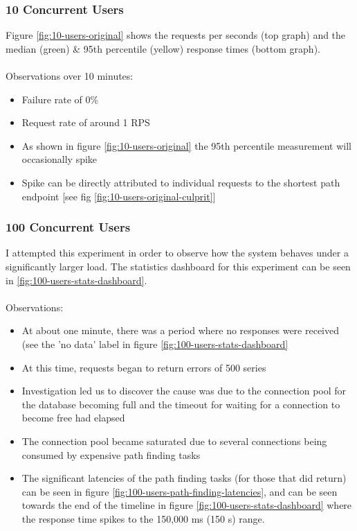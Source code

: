 \subsubsection{10 Concurrent Users}
Figure \ref{fig:10-users-original} shows the requests per seconds (top graph) and the median (green) \& 95th percentile (yellow) response times (bottom graph). 
\\\\
Observations over 10 minutes:
\begin{itemize}
    \item Failure rate of 0\%
    \item Request rate of around 1 RPS
    \item As shown in figure \ref{fig:10-users-original} the 95th percentile measurement will occasionally spike
    \item Spike can be directly attributed to individual requests to the shortest path endpoint [see fig \ref{fig:10-users-original-culprit}]
\end{itemize}

\subsubsection{100 Concurrent Users}
I attempted this experiment in order to observe how the system behaves under a significantly larger load. The statistics dashboard for this experiment can be seen in \ref{fig:100-users-stats-dashboard}. 
\\\\
Observations:
\begin{itemize}
    \item At about one minute, there was a period where no responses were received (see the 'no data' label in figure \ref{fig:100-users-stats-dashboard}
    \item At this time, requests began to return errors of 500 series
    \item Investigation led us to discover the cause was due to the connection pool for the database becoming full and the timeout for waiting for a connection to become free had elapsed
    \item The connection pool became saturated due to several connections being consumed by expensive path finding tasks
    \item The significant latencies of the path finding tasks (for those that did return) can be seen in figure \ref{fig:100-users-path-finding-latencies}, and can be seen towards the end of the timeline in figure \ref{fig:100-users-stats-dashboard} where the response time spikes to the 150,000 ms (150 s) range. 
    
\end{itemize}

